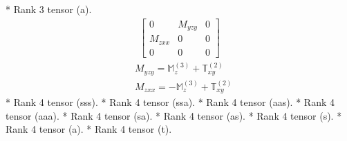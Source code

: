 \documentclass[fleqn,8pt,landscape]{jsarticle}
\begin{document}
* Rank 3 tensor (a).
\begin{align*}
\begin{bmatrix} 0 & M_{yzy} & 0 \\ M_{zxx} & 0 & 0 \\ 0 & 0 & 0 \end{bmatrix}
\end{align*}
\begin{align*}
& M_{yzy} = \mathbb{M}_{z}^{(3)} + \mathbb{T}_{xy}^{(2)} \\
& M_{zxx} = - \mathbb{M}_{z}^{(3)} + \mathbb{T}_{xy}^{(2)}
\end{align*}
* Rank 4 tensor (sss).
* Rank 4 tensor (ssa).
* Rank 4 tensor (aas).
* Rank 4 tensor (aaa).
* Rank 4 tensor (sa).
* Rank 4 tensor (as).
* Rank 4 tensor (s).
* Rank 4 tensor (a).
* Rank 4 tensor (t).
\end{document}

